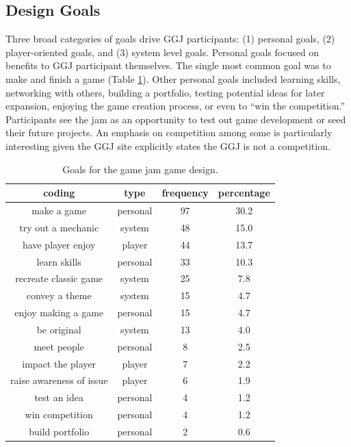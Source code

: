 \documentclass{sig-alternate}
\begin{document}
\subsection{Design Goals}
Three broad categories of goals drive GGJ participants: (1) personal goals, (2) player-oriented goals, and (3) system level goals.
Personal goals focused on benefits to GGJ participant themselves. 
The single most common goal was to make and finish a game (Table \ref{tab:goals}). 
Other personal goals included learning skills, networking with others, building a portfolio, testing potential ideas for later expansion, enjoying the game creation process, or even to ``win the competition.'' 
Participants see the jam as an opportunity to test out game development or seed their future projects.
An emphasis on competition among some is particularly interesting given the GGJ site explicitly states the GGJ is not a competition. %

\begin{table}[tb]
\centering
\scriptsize
\begin{tabular}{|c|c|c|c|}
\hline coding & type & frequency & percentage \\ 
\hline make a game & personal & 97 & 30.2 \\ 
\hline try out a mechanic & system & 48 & 15.0 \\ 
\hline have player enjoy & player & 44 & 13.7 \\ 
\hline learn skills & personal & 33 & 10.3 \\ 
\hline recreate classic game & system & 25 & 7.8 \\ 
\hline convey a theme & system & 15 & 4.7 \\ 
\hline enjoy making a game & personal & 15 & 4.7 \\ 
\hline be original & system & 13 & 4.0 \\ 
\hline meet people & personal & 8 & 2.5 \\ 
\hline impact the player & player & 7 & 2.2 \\ 
\hline raise awareness of issue & player & 6 & 1.9 \\ 
\hline test an idea & personal & 4 & 1.2 \\ 
\hline win competition & personal & 4 & 1.2 \\ 
\hline build portfolio & personal & 2 & 0.6 \\ 
\hline 
\end{tabular} 
\caption{Goals for the game jam game design.}
\label{tab:goals}
\end{table}
\end{document}
